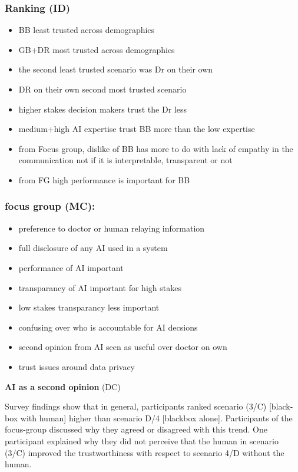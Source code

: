\documentclass[manuscript,screen,review]{acmart}
\begin{document}

\subsubsection{Ranking (ID)}
\begin{itemize}
    \item BB least trusted across demographics
    \item GB+DR most trusted across demographics
    \item the second least trusted scenario was Dr on their own
    \item DR on their own second most trusted scenario
    \item higher stakes decision makers trust the Dr less
    \item medium+high AI expertise trust BB more than the low expertise
    \item from Focus group, dislike of BB has more to do with lack of empathy in the communication not if it is interpretable, transparent or not
    \item from FG high performance is important for BB
\end{itemize}

\subsubsection{focus group (MC):}
\begin{itemize}
    \item preference to doctor or human relaying information
    \item full disclosure of any AI used in a system
    \item performance of AI important
    \item transparancy of AI important for high stakes
    \item low stakes transparancy less important
    \item confusing over who is accountable for AI decsions
    \item second opinion from AI seen as useful over doctor on own
    \item trust issues around data privacy
\end{itemize}

\textbf{AI as a second opinion} (DC)

Survey findings show that in general, participants ranked scenario (3/C) [black-box with human] higher than scenario D/4 [blackbox alone]. 
Participants of the focus-group discussed why they agreed or disagreed with this trend. One participant explained why they did not perceive that the human in scenario (3/C) improved the trustworthiness with respect to scenario 4/D without the human. 
\end{document}
